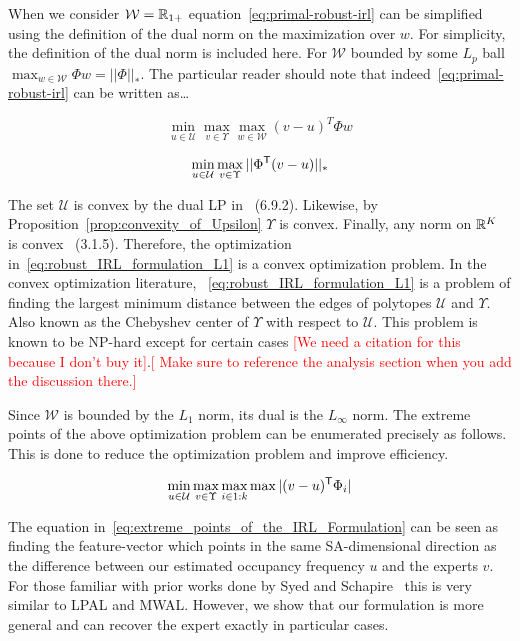 \documentclass[11pt]{article}
\newcommand{\gersi}[1]{\textcolor{red}{[#1]}}
\begin{document}
When we consider $\mathcal{W} = \mathbb{R}_{1+}$ equation~\eqref{eq:primal-robust-irl} can be simplified using the definition of the dual norm on the maximization
over $w$. For simplicity, the definition of the dual norm is included here. For $\mathcal{W}$ bounded by some $L_p$ ball $\max_{w \in \mathcal{W}} \Phi w = ||\Phi||_*$.
The particular reader should note that indeed~\eqref{eq:primal-robust-irl} can be written as\dots

\begin{equation}
	\min_{u \in \mathcal{U}} \max_{v \in \Upsilon} \max_{w \in \mathcal{W}} {(v - u)}^T \Phi w
\end{equation}

\begin{equation}
	\label{eq:robust_IRL_formulation_L1}
	\min_{u \in \mathcal{U}} \max_{v \in \Upsilon} ||\Phi^{\mathsf{T}} (v - u)||_*
\end{equation}

The set $\mathcal{U}$ is convex by the dual LP in~\cite{Puterman1994} (6.9.2).
Likewise, by Proposition~\ref{prop:convexity_of_Upsilon} $\Upsilon$ is convex.
Finally, any norm on $\mathbb{R}^K$ is convex~\cite{boyd_convex_optimization} (3.1.5).
Therefore, the optimization in~\eqref{eq:robust_IRL_formulation_L1} is a convex
optimization problem. In the convex optimization literature,
~\eqref{eq:robust_IRL_formulation_L1} is a problem of finding the largest minimum
distance between the edges of polytopes $\mathcal{U}$ and $\Upsilon$. Also known as the Chebyshev center of $\Upsilon$ with respect to $\mathcal{U}$.
This problem is known to be NP-hard except for certain cases \gersi{We need a
	citation for this because I don't buy it}.\gersi{ Make sure to reference the analysis section when you add the discussion there.}

Since $\mathcal{W}$ is bounded by the $L_1$ norm, its dual is the $L_\infty$ norm. The extreme points of the above
optimization problem can be enumerated precisely as follows.
This is done to reduce the optimization problem and improve efficiency.

\begin{equation}
	\label{eq:extreme_points_of_the_IRL_Formulation}
	\min_{u \in \mathcal{U}} \max_{v \in \Upsilon} \max_{i \in 1:k} \max|(v - u)^{\mathsf{T}} \Phi_i|
\end{equation}

The equation in~\eqref{eq:extreme_points_of_the_IRL_Formulation} can be seen as
finding the feature-vector which points in the same SA-dimensional direction as
the difference between our estimated occupancy frequency $u$ and the experts
$v$. For those familiar with prior works done by Syed and Schapire~\cite{Syed2008} this is very similar to LPAL and MWAL.
However, we show that our formulation is more general and can recover the expert exactly in particular cases.
\end{document}
